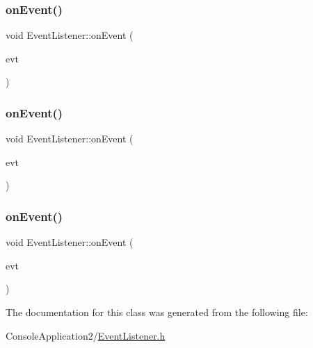 \subsubsection{\texorpdfstring{on\+Event()}{onEvent()}\hspace{0.1cm}{\footnotesize\ttfamily [1/3]}}
{\footnotesize\ttfamily void Event\+Listener\+::on\+Event (\begin{DoxyParamCaption}\item[{\hyperlink{class_event_listener_ae72c5cb67f8dc880170bf2137837f6ce}{Key\+Down\+Event}}]{evt }\end{DoxyParamCaption})\hspace{0.3cm}{\ttfamily [inline]}}

\hypertarget{class_event_listener_a7f968abfca56b699a69b10a6c9af5902}{}\label{class_event_listener_a7f968abfca56b699a69b10a6c9af5902} 
\subsubsection{\texorpdfstring{on\+Event()}{onEvent()}\hspace{0.1cm}{\footnotesize\ttfamily [2/3]}}
{\footnotesize\ttfamily void Event\+Listener\+::on\+Event (\begin{DoxyParamCaption}\item[{\hyperlink{class_event_listener_a69daf2aeedcab55e1f2c1c178206789e}{Key\+Up\+Event}}]{evt }\end{DoxyParamCaption})\hspace{0.3cm}{\ttfamily [inline]}}

\hypertarget{class_event_listener_aa29c811d59b30bf71e00a30d33c7f82c}{}\label{class_event_listener_aa29c811d59b30bf71e00a30d33c7f82c} 
\subsubsection{\texorpdfstring{on\+Event()}{onEvent()}\hspace{0.1cm}{\footnotesize\ttfamily [3/3]}}
{\footnotesize\ttfamily void Event\+Listener\+::on\+Event (\begin{DoxyParamCaption}\item[{\hyperlink{class_event_listener_a23add62d02511a54eba0bae8208f9f48}{Generic\+Event}}]{evt }\end{DoxyParamCaption})\hspace{0.3cm}{\ttfamily [inline]}}



The documentation for this class was generated from the following file\+:\begin{DoxyCompactItemize}
\item 
Console\+Application2/\hyperlink{_event_listener_8h}{Event\+Listener.\+h}\end{DoxyCompactItemize}
